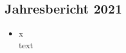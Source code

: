 
\subsection{Jahresbericht 2021}
\begin{history}

    \begin{itemize}

        \item[]x\\
        text

    \end{itemize}

\end{history}
